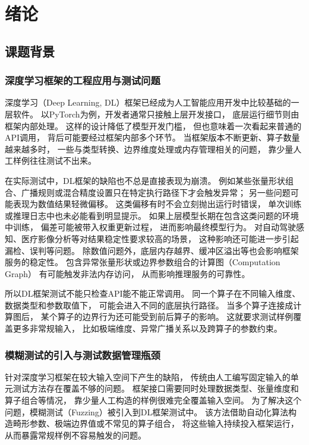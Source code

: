\chapter{绪论}

\section{课题背景}

\subsection{深度学习框架的工程应用与测试问题}

深度学习（Deep Learning, DL）框架已经成为人工智能应用开发中比较基础的一层软件。
以PyTorch为例，开发者通常只接触上层开发接口，
底层运行细节则由框架内部处理。
这样的设计降低了模型开发门槛，
但也意味着一次看起来普通的API调用，
背后可能要经过框架内部多个环节。
当框架版本不断更新、算子数量越来越多时，
一些与类型转换、边界维度处理或内存管理相关的问题，
靠少量人工样例往往测试不出来\cite{ref_dl_testing}。

在实际测试中，DL框架的缺陷也不总是直接表现为崩溃。
例如某些张量形状组合、广播规则或混合精度设置只在特定执行路径下才会触发异常；
另一些问题可能表现为数值结果轻微偏移。
这类偏移有时不会立刻抛出运行时错误，
单次训练或推理日志中也未必能看到明显提示。
如果上层模型长期在包含这类问题的环境中训练，
偏差可能被带入权重更新过程，
进而影响最终模型行为\cite{ref_dl_safety}。
对自动驾驶感知、医疗影像分析等对结果稳定性要求较高的场景，
这种影响还可能进一步引起漏检、误判等问题。
除数值问题外，底层内存越界、缓冲区溢出等也会影响框架服务的稳定性。
包含异常张量形状或边界参数组合的计算图（Computation Graph）
有可能触发非法内存访问，
从而影响推理服务的可靠性\cite{ref_dl_vulnerability}。

所以DL框架测试不能只检查API能不能正常调用。
同一个算子在不同输入维度、数据类型和参数取值下，
可能会进入不同的底层执行路径。
当多个算子连接成计算图后，
某个算子的边界行为还可能受到前后算子的影响。
这就要求测试样例覆盖更多非常规输入，
比如极端维度、异常广播关系以及跨算子的参数约束。

\subsection{模糊测试的引入与测试数据管理瓶颈}

针对深度学习框架在较大输入空间下产生的缺陷，
传统由人工编写固定输入的单元测试方法存在覆盖不够的问题。
框架接口需要同时处理数据类型、张量维度和算子组合等情况，
靠少量人工构造的样例很难完全覆盖输入空间。
为了解决这个问题，模糊测试（Fuzzing）被引入到DL框架测试中\cite{ref_fuzzing_survey}。
该方法借助自动化算法构造畸形参数、极端边界值或不常见的算子组合，
将这些输入持续投入框架运行，
从而暴露常规样例不容易触发的问题。

